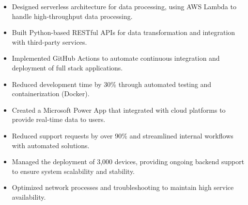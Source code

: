 \par\bigskip
{}
\par\smallskip
\begin{minipage}{13.75cm}
  \begin{minipage}{6.5cm}
    \begin{itemize}
      \item Designed serverless architecture for data processing, using AWS Lambda to handle high-throughput data processing.
      \item Built Python-based RESTful APIs for data transformation and integration with third-party services.
    \end{itemize}
  \end{minipage}
  \hfill
  \begin{minipage}{6.5cm}
    \begin{itemize}
      \item Implemented GitHub Actions to automate continuous integration and deployment of full stack applications.
      \item Reduced development time by 30\% through automated testing and containerization (Docker).
    \end{itemize}
  \end{minipage}
\end{minipage}
\par\smallskip
\divider

\par\smallskip
\begin{minipage}{13.75cm}
  \begin{minipage}{6.5cm}
    \begin{itemize}
      \item Created a Microsoft Power App that integrated with cloud platforms to provide real-time data to users.
      \item Reduced support requests by over 90\% and streamlined internal workflows with automated solutions.
    \end{itemize}
  \end{minipage}
  \hfill
  \begin{minipage}{6.5cm}
    \begin{itemize}
      \item Managed the deployment of 3,000 devices, providing ongoing backend support to ensure system scalability and stability.
      \item Optimized network processes and troubleshooting to maintain high service availability.
    \end{itemize}
  \end{minipage}
\end{minipage}
\par\smallskip
\divider

